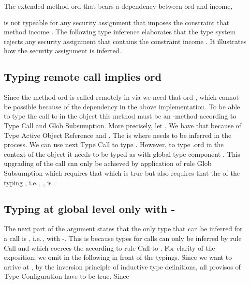 \documentclass[10pt, conference, compsocconf]{IEEEtran}
\newcommand\ie{i.e.\!\,, }
\begin{document}
{\noindent \begin{small}

\end{small}

\noindent \begin{small}

\end{small}


The extended method ord that bears a dependency between ord and income,
\begin{small}

\end{small}
is not typeable for any security assignment  that imposes the constraint that
method income . 
The following type inference elaborates that the type system rejects any
security assignment that contains the constraint income . 
It illustrates how the security assignment  is inferred.

\subsection*{Typing remote call implies ord }
Since the method ord is called remotely in  via  we need that ord ,
which cannot be possible because of the dependency in the above implementation.
To be able to type the call to  in the object   
this method must be an -method according to {\sc Type Call} and {\sc Glob Subsumption}.
More precisely, let .
We have that 
 because of {\sc Type Active Object Reference} and .
The  is  where  needs to be inferred 
in the process. We can use next {\sc Type Call} to type 
.
However, to type .ord in the context of the object  it needs to be typed as
 with global type component . This upgrading of the
call can only be achieved by application of rule {\sc Glob Subsumption} which requires
that  which is true but also requires that the 
of the typing , \ie , is .

\subsection*{Typing  at global level  only with -}
The next part of the argument states that the only type that can be inferred for a call 
is , \ie with -.
This is because types for calls can only be inferred by rule {\sc Call} and  
which coerces the  according to rule {\sc Call} to . 
For clarity of the exposition, we omit in the following 
 in front of the typings.
Since we want to arrive at ,
by the inversion principle of inductive type definitions,
all provisos of {\sc Type Configuration} have to be true.
Since

}
\end{document}
